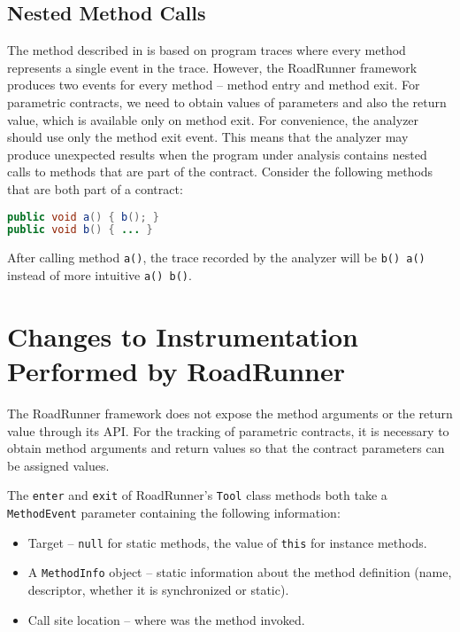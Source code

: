 \subsection{Nested Method Calls}

The method described in \cite{contracts} is based on program traces where
every method represents a single event in the trace. However, the RoadRunner
framework produces two events for every method -- method entry and method exit.
For parametric contracts, we need to obtain values of parameters and also the
return value, which is available only on method exit. For convenience, the
analyzer should use only the method exit event. This means that the analyzer may
produce unexpected results when the program under analysis contains nested calls
to methods that are part of the contract. Consider the following methods that
are both part of a contract:

\begin{lstlisting}[language=java]
public void a() { b(); }
public void b() { ... }
\end{lstlisting}

After calling method \texttt{a()}, the trace recorded by the analyzer will be
\texttt{b() a()} instead of more intuitive \texttt{a() b()}.

\section{Changes to Instrumentation Performed by RoadRunner}
\label{instrChanges}

The RoadRunner framework does not expose the method arguments or the return
value through its API. For the tracking of parametric contracts, it is necessary
to obtain method arguments and return values so that the contract parameters
can be assigned values.

The \texttt{enter} and \texttt{exit} of RoadRunner's \texttt{Tool} class methods
both take a \texttt{MethodEvent} parameter containing the following information:
\begin{itemize}
    \item Target -- \texttt{null} for static methods, the value of \texttt{this}
        for instance methods.
    \item A \texttt{MethodInfo} object -- static information about the method
        definition (name, descriptor, whether it is synchronized or static).
    \item Call site location -- where was the method invoked.
\end{itemize}

